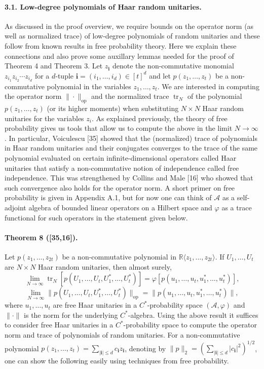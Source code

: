 \paragraph{3.1. Low-degree polynomials of Haar random unitaries.}
As discussed in the proof overview, we require bounds on the operator norm (as well as normalized trace) of low-degree polynomials of random unitaries and these follow from known results in free probability theory. Here we explain these connections and also prove some auxillary lemmas needed for the proof of Theorem 4 and Theorem 3.
Let $z_{\mathbf i}$ denote the non-commutative monomial $z_{i_1}z_{i_2}\cdots z_{i_d}$ for a $d$-tuple $\mathbf i=(i_1,\ldots,i_d)\in[t]^d$ and let $p(z_1,\ldots,z_t)$ be a non-commutative polynomial in the variables $z_1,\ldots,z_t$. We are interested in computing the operator norm $\|\cdot\|_{\mathrm{op}}$ and the normalized trace $\operatorname{tr}_N$ of the polynomial $p(z_1,\ldots,z_t)$ (or its higher moments) when substituting $N\times N$ Haar random unitaries for the variables $z_i$.
As explained previously, the theory of free probability gives us tools that allow us to compute the above in the limit $N\to\infty$. In particular, Voiculescu [35] showed that the (normalized) trace of polynomials in Haar random unitaries and their conjugates converges to the trace of the same polynomial evaluated on certain infinite-dimensional operators called Haar unitaries that satisfy a non-commutative notion of independence called free independence. This was strengthened by Collins and Male [16] who showed that such convergence also holds for the operator norm. A short primer on free probability is given in Appendix A.1, but for now one can think of $\mathcal A$ as a self-adjoint algebra of bounded linear operators on a Hilbert space and $\varphi$ as a trace functional for such operators in the statement given below.
\paragraph{Theorem 8 ([35,16]).}
Let $p(z_1,\ldots,z_{2t})$ be a non-commutative polynomial in $\mathbb R\langle z_1,\ldots,z_{2t}\rangle$. If $U_1,\ldots,U_t$ are $N\times N$ Haar random unitaries, then almost surely,
\[\lim_{N\to\infty}\operatorname{tr}_N[p(U_1,\ldots,U_t,U_1^*,\ldots,U_t^*)]=\varphi[p(u_1,\ldots,u_t,u_1^*,\ldots,u_t^*)],\]
\[\lim_{N\to\infty}\|p(U_1,\ldots,U_t,U_1^*,\ldots,U_t^*)\|_{\mathrm{op}}=\|p(u_1,\ldots,u_t,u_1^*,\ldots,u_t^*)\|,\]
where $u_1,\ldots,u_t$ are free Haar unitaries in a $C^*$-probability space $(\mathcal A,\varphi)$ and $\|\cdot\|$ is the norm for the underlying $C^*$-algebra.
Using the above result it suffices to consider free Haar unitaries in a $C^*$-probability space to compute the operator norm and trace of polynomials of random unitaries. For a non-commutative polynomial $p(z_1,\ldots,z_t)=\sum_{|\mathbf i|\leq d}c_{\mathbf i}z_{\mathbf i}$, denoting by $\|p\|_2=(\sum_{|\mathbf i|\leq d}|c_{\mathbf i}|^2)^{1/2}$, one can show the following easily using techniques from free probability.

